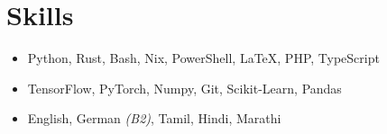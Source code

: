 %

\section*{Skills}
\begin{itemize}
\setlength{\itemsep}{0mm}

\item {}\iftoggle{onepage}{\\}{ }Python, Rust, Bash, Nix, PowerShell, \LaTeX, PHP, TypeScript
\item {}\iftoggle{onepage}{\\}{ }TensorFlow, PyTorch, Numpy, Git, Scikit-Learn, Pandas
\item {}\iftoggle{onepage}{\\}{ }English, German \textit{\textcolor{misc}{(B2)}}, Tamil, Hindi, Marathi

\end{itemize}
